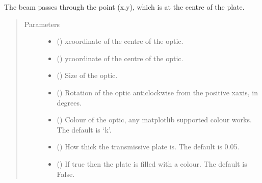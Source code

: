 \documentclass[letterpaper,10pt,english]{sphinxmanual}
\begin{document}
\begin{fulllineitems}
\begin{fulllineitems}
\sphinxAtStartPar
The beam passes through the point (x,y), which is at the centre of the plate.
\begin{quote}\begin{description}
\item[{Parameters}] \leavevmode\begin{itemize}
\item {} 
\sphinxAtStartPar
{} () \textendash{} x\sphinxhyphen{}coordinate of the centre of the optic.

\item {} 
\sphinxAtStartPar
{} () \textendash{} y\sphinxhyphen{}coordinate of the centre of the optic.

\item {} 
\sphinxAtStartPar
{} () \textendash{} Size of the optic.

\item {} 
\sphinxAtStartPar
{} () \textendash{} Rotation of the optic anticlockwise from the positive x\sphinxhyphen{}axis, in degrees.

\item {} 
\sphinxAtStartPar
{} (\sphinxstyleliteralemphasis{\sphinxupquote{, }}) \textendash{} Colour of the optic, any matplotlib supported colour works. The default is ‘k’.

\item {} 
\sphinxAtStartPar
{} (\sphinxstyleliteralemphasis{\sphinxupquote{, }}) \textendash{} How thick the transmissive plate is. The default is 0.05.

\item {} 
\sphinxAtStartPar
{} (\sphinxstyleliteralemphasis{\sphinxupquote{, }}) \textendash{} If true then the plate is filled with a colour. The default is False.


\end{itemize}
\end{description}
\end{quote}
\end{fulllineitems}
\end{fulllineitems}
\end{document}
